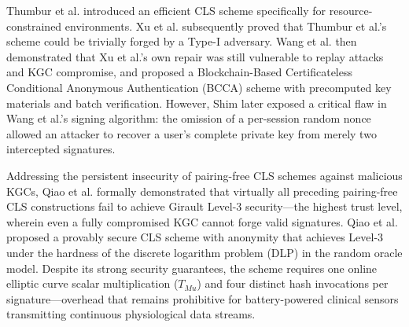 \documentclass[conference]{IEEEtran}
\begin{document}
Thumbur et al. \cite{ref11} introduced an efficient CLS scheme specifically for resource-constrained environments. Xu et al. \cite{ref21} subsequently proved that Thumbur et al.'s scheme could be trivially forged by a Type-I adversary. Wang et al. \cite{ref1} then demonstrated that Xu et al.'s own repair was still vulnerable to replay attacks and KGC compromise, and proposed a Blockchain-Based Certificateless Conditional Anonymous Authentication (BCCA) scheme with precomputed key materials and batch verification. However, Shim \cite{ref23} later exposed a critical flaw in Wang et al.'s signing algorithm: the omission of a per-session random nonce allowed an attacker to recover a user's complete private key from merely two intercepted signatures.

Addressing the persistent insecurity of pairing-free CLS schemes against malicious KGCs, Qiao et al. \cite{ref24} formally demonstrated that virtually all preceding pairing-free CLS constructions fail to achieve Girault Level-3 security—the highest trust level, wherein even a fully compromised KGC cannot forge valid signatures. Qiao et al. proposed a provably secure CLS scheme with anonymity that achieves Level-3 under the hardness of the discrete logarithm problem (DLP) in the random oracle model. Despite its strong security guarantees, the scheme requires one online elliptic curve scalar multiplication ($T_{Mu}$) and four distinct hash invocations per signature—overhead that remains prohibitive for battery-powered clinical sensors transmitting continuous physiological data streams.
\end{document}
